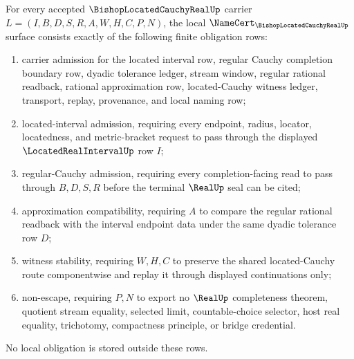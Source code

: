 \begin{theorem}
\label{thm:bishop-located-cauchy-real-namecert-obligations}
For every accepted $\BishopLocatedCauchyRealUp$ carrier $L=(I,B,D,S,R,A,W,H,C,P,N)$, the local $\NameCert_{\BishopLocatedCauchyRealUp}$ surface consists exactly of the following finite obligation rows:
\begin{enumerate}
\item carrier admission for the located interval row, regular Cauchy completion boundary row, dyadic tolerance ledger, stream window, regular rational readback, rational approximation row, located-Cauchy witness ledger, transport, replay, provenance, and local naming row;
\item located-interval admission, requiring every endpoint, radius, locator, locatedness, and metric-bracket request to pass through the displayed $\LocatedRealIntervalUp$ row $I$;
\item regular-Cauchy admission, requiring every completion-facing read to pass through $B,D,S,R$ before the terminal $\RealUp$ seal can be cited;
\item approximation compatibility, requiring $A$ to compare the regular rational readback with the interval endpoint data under the same dyadic tolerance row $D$;
\item witness stability, requiring $W,H,C$ to preserve the shared located-Cauchy route componentwise and replay it through displayed continuations only;
\item non-escape, requiring $P,N$ to export no $\RealUp$ completeness theorem, quotient stream equality, selected limit, countable-choice selector, host real equality, trichotomy, compactness principle, or bridge credential.
\end{enumerate}
No local obligation is stored outside these rows.
\end{theorem}
